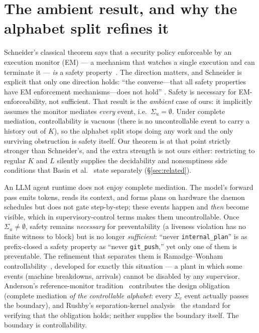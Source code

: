 \documentclass[11pt,a4paper]{article}  \usepackage{mdframed} \usepackage{graphicx} \usepackage{tabularx}
\begin{document}
\section{The ambient result, and why the alphabet split refines it}\label{sec:schneider} Schneider's classical theorem says
that a security policy enforceable by an execution monitor (EM) --- a mechanism that watches a single execution and can
terminate it --- \emph{is} a safety property~\cite{schneider}. The direction matters, and Schneider is explicit that only one
direction holds: ``the converse---that all safety properties have EM enforcement mechanisms---does not hold''
\cite[p.~35]{schneider}. Safety is necessary for EM-enforceability, not sufficient. That result is the \emph{ambient} case of
ours: it implicitly assumes the monitor mediates \emph{every} event, i.e.\ $\Sigma_u=\emptyset$. Under complete mediation,
controllability is vacuous (there is no uncontrollable event to carry a history out of $K$), so the alphabet split stops
doing any work and the only surviving obstruction is safety itself. Our theorem is at that point strictly stronger than
Schneider's, and the extra strength is not ours either: restricting to regular $K$ and $L$ silently supplies the
decidability and nonemptiness side conditions that Basin et al.~\cite{bjkz13} state separately (\S\ref{sec:related}).

An LLM agent runtime does not enjoy complete mediation. The model's forward pass emits tokens, reads its context, and forms
plans on hardware the daemon schedules but does not gate step-by-step; these events happen and \emph{then} become visible,
which in supervisory-control terms makes them uncontrollable. Once $\Sigma_u\neq\emptyset$, safety remains \emph{necessary}
for preventability (a liveness violation has no finite witness to block) but is no longer \emph{sufficient}: ``never
\texttt{internal\_\allowbreak plan}'' is as prefix-closed a safety property as ``never \texttt{git\_\allowbreak push},'' yet only one of them is
preventable. The refinement that separates them is Ramadge--Wonham controllability~\cite{rw87,rw89}, developed for exactly
this situation --- a plant in which some events (machine breakdowns, arrivals) cannot be disabled by any supervisor.
Anderson's reference-monitor tradition~\cite{anderson} contributes the design obligation (complete mediation \emph{of the
controllable alphabet}: every $\Sigma_c$ event actually passes the boundary), and Rushby's separation-kernel
analysis~\cite{rushby} the standard for verifying that the obligation holds; neither supplies the boundary itself. The
boundary is controllability.
\end{document}
